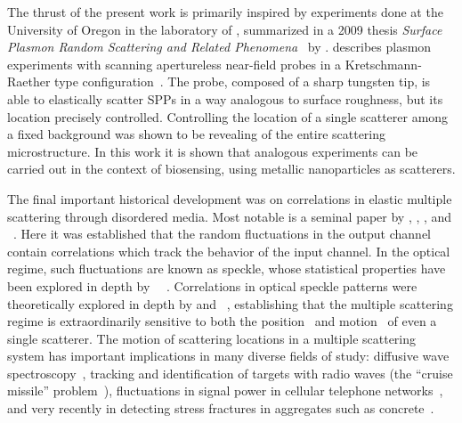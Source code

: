 The thrust of the present work is primarily inspired by experiments done at
the University of Oregon in the laboratory of , summarized in
a 2009 thesis \textit{Surface Plasmon Random Scattering and Related
Phenomena}~\cite{schumann2009surface} by .  
describes plasmon experiments with scanning apertureless near-field probes
in a Kretschmann-Raether type configuration~\cite{kim1995scanning}.  The
probe, composed of a sharp tungsten tip, is able to elastically scatter
SPPs in a way analogous to surface roughness, but its location precisely
controlled.  Controlling the location of a single scatterer among a fixed
background was shown to be revealing of the entire scattering
microstructure.  In this work it is shown that analogous experiments can be
carried out in the context of biosensing, using metallic nanoparticles as
scatterers.

The final important historical development was on correlations in elastic
multiple scattering through disordered media.  Most notable is a seminal
paper by , , , and
~\cite{feng1988correlations}.  Here it was established that
the random fluctuations in the output channel contain correlations which
track the behavior of the input channel.  In the optical regime, such
fluctuations are known as speckle, whose statistical properties have been
explored in depth by
~\cite{goodman2007speckle}~\cite{goodman1975statistical}.
Correlations in optical speckle patterns were theoretically explored in
depth by  and ~\cite{berkovits1994correlations},
establishing that the multiple scattering regime is extraordinarily
sensitive to both the position~\cite{berkovits1990theory} and
motion~\cite{berkovits1991sensitivity} of even a single scatterer.  The
motion of scattering locations in a multiple scattering system has
important implications in many diverse fields of study: diffusive wave
spectroscopy~\cite{pine1988diffusing}, tracking and identification of
targets with radio waves (the ``cruise missile''
problem~\cite{atkins1991neural}), fluctuations in signal power in cellular
telephone networks~\cite{abdi2001estimation}, and very recently in
detecting stress fractures in aggregates such as
concrete~\cite{larose2010locating}.  
